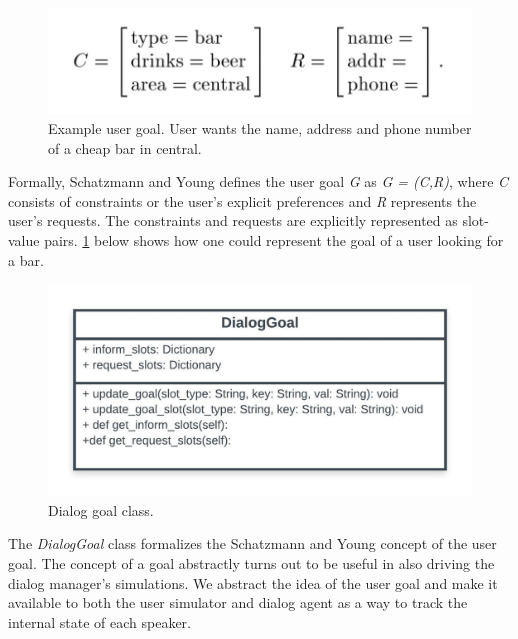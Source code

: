 \begin{figure}[h!]
	\includegraphics[scale=.35]{diagrams/schatzmann_goal_fig.jpeg}
	\caption{Example user goal. User wants the name, address and phone number of a cheap bar in central.  \cite{Schatzmann2009TheHA} }
	\label{fig:goals1}
\end{figure}

Formally, Schatzmann and Young defines the user goal \textit{G} as \textit{G = (C,R)}, where \textit{C} consists of constraints or the user's explicit preferences and \textit{R} represents the user's requests. The constraints and requests are explicitly represented as slot-value pairs. \ref{fig:goals1} below shows how one could represent the goal of a user looking for a bar. 

\begin{figure}[h!]
	\centering
	\includegraphics[scale=1]{diagrams/dialog_goal_class.jpeg}
	\caption{Dialog goal class.  }
	\label{fig:goal_class}
\end{figure}

The \textit{DialogGoal} class formalizes the Schatzmann and Young concept of the user goal. The concept of a goal abstractly turns out to be useful in also driving the dialog manager's simulations. We abstract the idea of the user goal and make it available to both the user simulator and dialog agent as a way to track the internal state of each speaker. 


